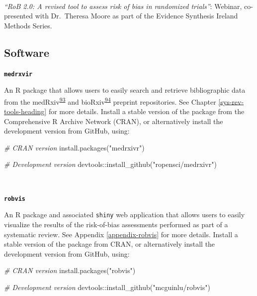 \documentclass[a4paper, twoside]{templates/ociamthesis}
\newenvironment{Shaded}{\begin{snugshade}}{\end{snugshade}}
\newcommand{\CommentTok}[1]{\textcolor[rgb]{0.56,0.35,0.01}{\textit{#1}}}
\newcommand{\FunctionTok}[1]{\textcolor[rgb]{0.00,0.00,0.00}{#1}}
\newcommand{\NormalTok}[1]{#1}
\newcommand{\SpecialCharTok}[1]{\textcolor[rgb]{0.00,0.00,0.00}{#1}}
\newcommand{\StringTok}[1]{\textcolor[rgb]{0.31,0.60,0.02}{#1}}
\renewenvironment{Shaded}
{
  \vspace{4pt}%
  \begin{snugshade}%
}{%
  \end{snugshade}%
  \vspace{4pt}%
}
\begin{document}
~

\emph{``RoB 2.0: A revised tool to assess risk of bias in randomized trials''}: Webinar, co-presented with Dr.~Theresa Moore as part of the Evidence Synthesis Ireland Methods Series.

\hypertarget{outputs-software}{%
\subsection{Software}\label{outputs-software}}

\textbf{\texttt{medrxvir}}

An R package that allows users to easily search and retrieve bibliographic data from the medRxiv\textsuperscript{\protect\hyperlink{ref-rawlinson2019}{93}} and bioRxiv\textsuperscript{\protect\hyperlink{ref-sever2019}{94}} preprint repositories. See Chapter \ref{sys-rev-tools-heading} for more details. Install a stable version of the package from the Comprehensive R Archive Network (CRAN), or alternatively install the development version from GitHub, using:

\begin{Shaded}
\begin{Highlighting}[]
\CommentTok{\# CRAN version}
\FunctionTok{install.packages}\NormalTok{(}\StringTok{"medrxivr"}\NormalTok{)}

\CommentTok{\# Development version}
\NormalTok{devtools}\SpecialCharTok{::}\FunctionTok{install\_github}\NormalTok{(}\StringTok{"ropensci/medrxivr"}\NormalTok{)}
\end{Highlighting}
\end{Shaded}

~

\textbf{\texttt{robvis}}

An R package and associated \texttt{shiny} web application that allows users to easily visualize the results of the risk-of-bias assessments performed as part of a systematic review. See Appendix \ref{appendix-robvis} for more details. Install a stable version of the package from CRAN, or alternatively install the development version from GitHub, using:

\begin{Shaded}
\begin{Highlighting}[]
\CommentTok{\# CRAN version}
\FunctionTok{install.packages}\NormalTok{(}\StringTok{"robvis"}\NormalTok{)}

\CommentTok{\# Development version}
\NormalTok{devtools}\SpecialCharTok{::}\FunctionTok{install\_github}\NormalTok{(}\StringTok{"mcguinlu/robvis"}\NormalTok{)}
\end{Highlighting}
\end{Shaded}
\end{document}
